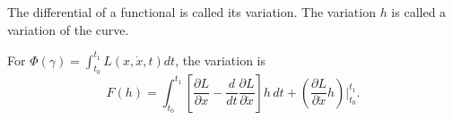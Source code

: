 The differential of a functional is called its variation. The variation $h$ is called a variation of the curve.

For $\Phi(\gamma) = \int_{t_0}^{t_1} L(x, \dot{x}, t)dt$, the variation is
$$F(h) = \int_{t_0}^{t_1} \left[ \frac{\partial L}{\partial x} - \frac{d}{dt}\frac{\partial L}{\partial \dot{x}} \right] h \, dt + \left( \frac{\partial L}{\partial \dot{x}} h \right)\Bigg|_{t_0}^{t_1}.$$
